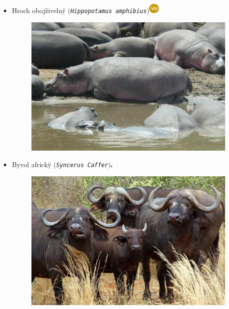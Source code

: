 \documentclass{article}
\begin{document}
\begin{itemize}
\newpage
\item Hroch obojživelný $($\texttt{\textit{Hippopotamus amphibius}}$)$\includegraphics[width=0.04\textwidth,natwidth=200,natheight=200]{VU.png}\\
\begin{figure}[h]

\includegraphics[scale=0.4]{hrochy-masai.jpg}
\end{figure}


\item Byvol africký $($\texttt{\textit{Syncerus Caffer}}$)$\includegraphics[width=0.007\textwidth,natwidth=200,natheight=200]{LC.png}\\
\begin{figure}[h]

\includegraphics[scale=0.2]{byvoly-masai.jpg}
\end{figure}


\end{itemize}
\end{document}
